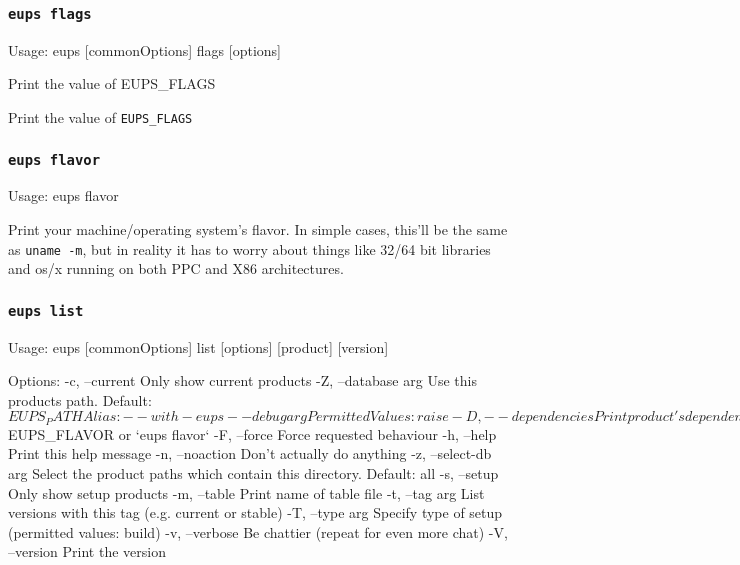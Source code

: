 \documentclass{article}
\newcommand{\code}[1]{\texttt{#1}}
\let\overbatim=\verbatim
\let\oendverbatim=\endverbatim
\renewenvironment{verbatim}
{\center\minipage{16cm}\overbatim}
{\oendverbatim\endminipage\endcenter}
\begin{document}
\subsubsection{\code{eups flags}}
\begin{verbatim}
Usage:
    eups [commonOptions] flags [options]

Print the value of EUPS_FLAGS
\end{verbatim}

Print the value of \code{EUPS\_FLAGS}


\subsubsection{\code{eups flavor}}
\begin{verbatim}
Usage:
   eups flavor
\end{verbatim}

Print your machine/operating system's flavor.  In simple cases, this'll
be the same as \code{uname -m}, but in reality it has to worry about things
like 32/64 bit libraries and os/x running on both PPC and X86 architectures.


\subsubsection{\code{eups list}}
\begin{verbatim}
Usage:
    eups [commonOptions] list [options] [product] [version]

Options:
   -c, --current           Only show current products
   -Z, --database   arg    Use this products path. Default: $EUPS_PATH
                           Alias: --with-eups
       --debug      arg    Permitted Values: raise
   -D, --dependencies      Print product's dependencies
       --depth      arg    Only list this many layers of dependency
   -d, --directory         Print product directory
   -e, --exact             Use the as-installed version, not the conditional in the table file
   -f, --flavor     arg    Use this flavor. Default: $EUPS_FLAVOR or `eups flavor`
   -F, --force             Force requested behaviour
   -h, --help              Print this help message
   -n, --noaction          Don't actually do anything
   -z, --select-db  arg    Select the product paths which contain this directory.
                           Default: all
   -s, --setup             Only show setup products
   -m, --table             Print name of table file
   -t, --tag        arg    List versions with this tag (e.g. current or stable)
   -T, --type       arg    Specify type of setup (permitted values: build)
   -v, --verbose           Be chattier (repeat for even more chat)
   -V, --version           Print the version
\end{verbatim}
\end{document}
